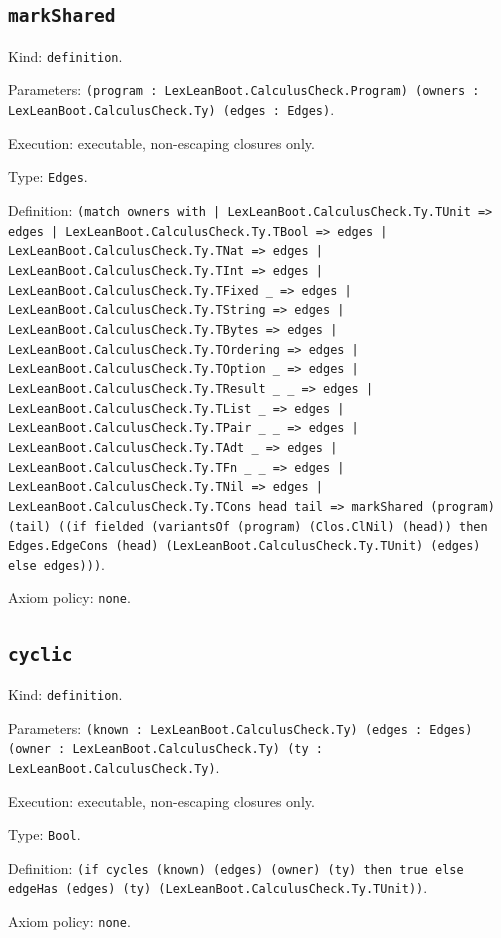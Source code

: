 \documentclass[11pt]{article}
\begin{document}
\subsection*{\texttt{markShared}}
\noindent Kind: \texttt{definition}.\par
\noindent Parameters: \texttt{(program : LexLeanBoot.CalculusCheck.Program) (owners : LexLeanBoot.CalculusCheck.Ty) (edges : Edges)}.\par
\noindent Execution: executable, non-escaping closures only.\par
\noindent Type: \texttt{Edges}.\par
\noindent Definition: \texttt{(match owners with | LexLeanBoot.CalculusCheck.Ty.TUnit => edges | LexLeanBoot.CalculusCheck.Ty.TBool => edges | LexLeanBoot.CalculusCheck.Ty.TNat => edges | LexLeanBoot.CalculusCheck.Ty.TInt => edges | LexLeanBoot.CalculusCheck.Ty.TFixed \_ => edges | LexLeanBoot.CalculusCheck.Ty.TString => edges | LexLeanBoot.CalculusCheck.Ty.TBytes => edges | LexLeanBoot.CalculusCheck.Ty.TOrdering => edges | LexLeanBoot.CalculusCheck.Ty.TOption \_ => edges | LexLeanBoot.CalculusCheck.Ty.TResult \_ \_ => edges | LexLeanBoot.CalculusCheck.Ty.TList \_ => edges | LexLeanBoot.CalculusCheck.Ty.TPair \_ \_ => edges | LexLeanBoot.CalculusCheck.Ty.TAdt \_ => edges | LexLeanBoot.CalculusCheck.Ty.TFn \_ \_ => edges | LexLeanBoot.CalculusCheck.Ty.TNil => edges | LexLeanBoot.CalculusCheck.Ty.TCons head tail => markShared (program) (tail) ((if fielded (variantsOf (program) (Clos.ClNil) (head)) then Edges.EdgeCons (head) (LexLeanBoot.CalculusCheck.Ty.TUnit) (edges) else edges)))}.\par
\noindent Axiom policy: \texttt{none}.\par
\subsection*{\texttt{cyclic}}
\noindent Kind: \texttt{definition}.\par
\noindent Parameters: \texttt{(known : LexLeanBoot.CalculusCheck.Ty) (edges : Edges) (owner : LexLeanBoot.CalculusCheck.Ty) (ty : LexLeanBoot.CalculusCheck.Ty)}.\par
\noindent Execution: executable, non-escaping closures only.\par
\noindent Type: \texttt{Bool}.\par
\noindent Definition: \texttt{(if cycles (known) (edges) (owner) (ty) then true else edgeHas (edges) (ty) (LexLeanBoot.CalculusCheck.Ty.TUnit))}.\par
\noindent Axiom policy: \texttt{none}.\par
\end{document}
